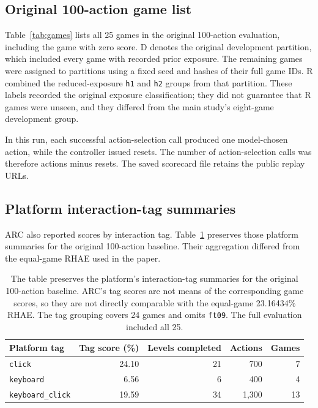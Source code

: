\subsection{Original 100-action game list}
Table~\ref{tab:games} lists all 25 games in the original 100-action evaluation, including the game with zero score. D denotes the original development partition, which included every game with recorded prior exposure. The remaining games were assigned to partitions using a fixed seed and hashes of their full game IDs. R combined the reduced-exposure \texttt{h1} and \texttt{h2} groups from that partition. These labels recorded the original exposure classification; they did not guarantee that R games were unseen, and they differed from the main study's eight-game development group.

In this run, each successful action-selection call produced one model-chosen action, while the controller issued resets. The number of action-selection calls was therefore actions minus resets. The saved scorecard file retains the public replay URLs.



\subsection{Platform interaction-tag summaries}
ARC also reported scores by interaction tag. Table~\ref{tab:tags} preserves those platform summaries for the original 100-action baseline. Their aggregation differed from the equal-game RHAE used in the paper.
\begin{table}[H]
\centering\small
\begin{tabular}{@{}lrrrr@{}}\toprule
Platform tag & Tag score (\%) & Levels completed & Actions & Games\\\midrule
\texttt{click} & 24.10 & 21 & 700 & 7\\
\texttt{keyboard} & 6.56 & 6 & 400 & 4\\
\texttt{keyboard\_click} & 19.59 & 34 & 1,300 & 13\\\bottomrule
\end{tabular}
\caption{The table preserves the platform's interaction-tag summaries for the original 100-action baseline. ARC's tag scores are not means of the corresponding game scores, so they are not directly comparable with the equal-game 23.16434\% RHAE. The tag grouping covers 24 games and omits \texttt{ft09}. The full evaluation included all 25.}\label{tab:tags}
\end{table}


